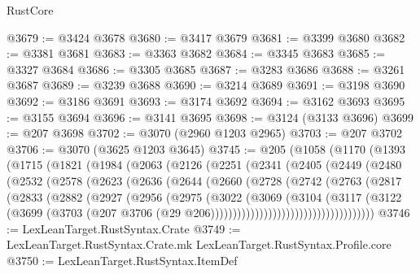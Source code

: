 \begin{lexlean}{RustCore}
\begin{coremodule}
@3679 := @3424 @3678
@3680 := @3417 @3679
@3681 := @3399 @3680
@3682 := @3381 @3681
@3683 := @3363 @3682
@3684 := @3345 @3683
@3685 := @3327 @3684
@3686 := @3305 @3685
@3687 := @3283 @3686
@3688 := @3261 @3687
@3689 := @3239 @3688
@3690 := @3214 @3689
@3691 := @3198 @3690
@3692 := @3186 @3691
@3693 := @3174 @3692
@3694 := @3162 @3693
@3695 := @3155 @3694
@3696 := @3141 @3695
@3698 := @3124 (@3133 @3696)
@3699 := @207 @3698
@3702 := @3070 (@2960 @1203 @2965)
@3703 := @207 @3702
@3706 := @3070 (@3625 @1203 @3645)
@3745 := @205
    (@1058
      (@1170
        (@1393
          (@1715
            (@1821
              (@1984
                (@2063
                  (@2126
                    (@2251
                      (@2341
                        (@2405
                          (@2449
                            (@2480
                              (@2532
                                (@2578
                                  (@2623
                                    (@2636
                                      (@2644
                                        (@2660
                                          (@2728
                                            (@2742
                                              (@2763
                                                (@2817
                                                  (@2833
                                                    (@2882
                                                      (@2927
                                                        (@2956
                                                          (@2975
                                                            (@3022
                                                              (@3069
                                                                (@3104
                                                                  (@3117
                                                                    (@3122
                                                                      (@3699
                                                                        (@3703
                                                                          (@207
                                                                            @3706
                                                                            (@29
                                                                              @206)))))))))))))))))))))))))))))))))))))
@3746 := LexLeanTarget.RustSyntax.Crate
@3749 := LexLeanTarget.RustSyntax.Crate.mk LexLeanTarget.RustSyntax.Profile.core
@3750 := LexLeanTarget.RustSyntax.ItemDef

\end{coremodule}
\end{lexlean}
